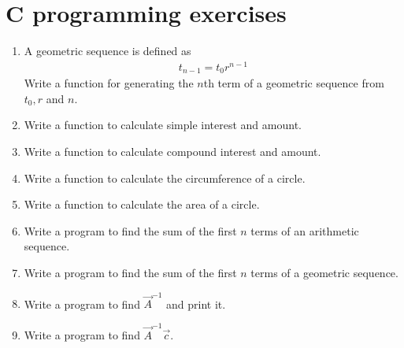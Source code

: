 \documentclass[journal,12pt,twocolumn]{IEEEtran}
\renewcommand\thesection{\arabic{section}}
\begin{document}
\section{C programming exercises}
\begin{enumerate}[label=\thesection.\arabic*
,ref=\thesection.\theenumi]
\item A geometric sequence is defined as
\begin{align}
\label{eq:geo}
t_{n-1} = t_0r^{n-1}
\end{align}
Write a function for generating the $n$th term of a geometric sequence from $t_0, r$ and $n$.
\item Write a function to calculate simple interest and amount.
\item Write a function to calculate compound interest and amount.
\item Write a function to calculate the circumference of a circle.
\item Write a function to calculate the area of a circle.

\item Write a program to find the sum of the first  $n$ terms of an arithmetic sequence.
\item Write a program to find the sum of the first  $n$ terms of a geometric sequence.
%
\item Write a program to find $\vec{A}^{-1}$ and print it.
\\
\solution 

\item Write a program to find $\vec{A}^{-1}\vec{c}$.
%

\end{enumerate}
\end{document}
